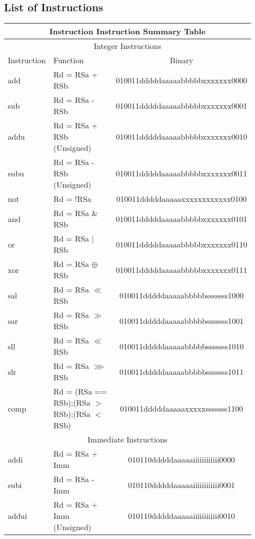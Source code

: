 \documentclass[letterpaper, 11pt]{article}
\begin{document}
\subsection{List of Instructions}

	\begin{center}
		\begin{longtable}{|l|l|c|}
			\multicolumn{3}{c}{Instruction Instruction Summary Table} \\ \hline
			\multicolumn{3}{|c|}{Integer Instructions} \\ \hline
			Instruction & Function 										& Binary \\ \hline
			add			& Rd = RSa + RSb 								& 010011dddddaaaaabbbbbxxxxxxx0000 \\
			sub			& Rd = RSa - RSb 								& 010011dddddaaaaabbbbbxxxxxxx0001 \\
			addu		& Rd = RSa + RSb (Unsigned) 					& 010011dddddaaaaabbbbbxxxxxxx0010 \\
			subu		& Rd = RSa - RSb (Unsigned)					 	& 010011dddddaaaaabbbbbxxxxxxx0011 \\
			not			& Rd = !RSa	 									& 010011dddddaaaaaxxxxxxxxxxxx0100 \\
			and			& Rd = RSa \& RSb								& 010011dddddaaaaabbbbbxxxxxxx0101 \\
			or			& Rd = RSa $|$ RSb 								& 010011dddddaaaaabbbbbxxxxxxx0110 \\
			xor			& Rd = RSa $\oplus$ RSb 						& 010011dddddaaaaabbbbbxxxxxxx0111 \\
			sal			& Rd = RSa $\ll$ RSb 							& 010011dddddaaaaabbbbbsssssss1000 \\
			sar			& Rd = RSa $\gg$ RSb 							& 010011dddddaaaaabbbbbsssssss1001 \\
			sll			& Rd = RSa $\ll$ RSb 							& 010011dddddaaaaabbbbbsssssss1010 \\
			slr			& Rd = RSa $ \ggg  $ RSb 						& 010011dddddaaaaabbbbbsssssss1011 \\
			comp		& Rd = (RSa == RSb);(RSa $>$ RSb);(RSa $<$ RSb)	& 010011dddddaaaaaxxxxxsssssss1100 \\
			\hline
			\multicolumn{3}{|c|}{Immediate Instructions} \\ \hline
			addi		& Rd = RSa + Imm 								& 010110dddddaaaaaiiiiiiiiiiii0000 \\
			subi		& Rd = RSa - Imm 								& 010110dddddaaaaaiiiiiiiiiiii0001 \\
			addui		& Rd = RSa + Imm (Unsigned)						& 010110dddddaaaaaiiiiiiiiiiii0010 \\

\end{longtable}
\end{center}
\end{document}
